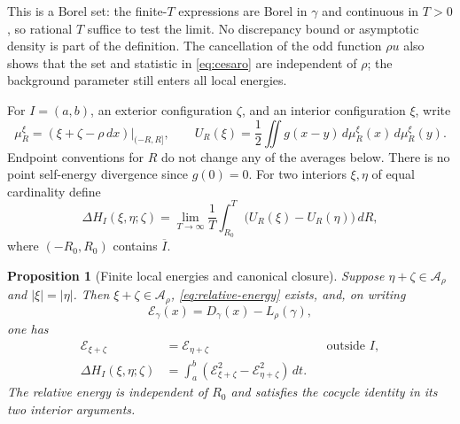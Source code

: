 \documentclass[11pt,reqno]{amsart}
\newtheorem{proposition}[theorem]{Proposition}
\theoremstyle{definition}
\theoremstyle{remark}
\newcommand{\1}{\mathbf 1}
\newcommand{\dd}{\,d}
\newcommand{\cA}{\mathcal A}
\numberwithin{equation}{section}
\begin{document}
This is a Borel set: the finite-$T$ expressions are Borel in $\gamma$
and continuous in $T>0$, so rational $T$ suffice to test the limit.
No discrepancy bound or asymptotic density is part of the definition.
The cancellation of the odd function $\rho u$ also shows that the
set and statistic in \eqref{eq:cesaro} are independent of $\rho$;
the background parameter still enters all local energies.

For $I=(a,b)$, an exterior configuration $\zeta$, and an interior
configuration $\xi$, write
\[
\mu_R^\xi=(\xi+\zeta-\rho\dd x)|_{(-R,R]},\qquad
U_R(\xi)=\frac12\iint g(x-y)\dd\mu_R^\xi(x)\dd\mu_R^\xi(y).
\]
Endpoint conventions for $R$ do not change any of the averages below.
There is no point self-energy divergence since $g(0)=0$.
For two interiors $\xi,\eta$ of equal cardinality define
\begin{equation}\label{eq:relative-energy}
\Delta H_I(\xi,\eta;\zeta)
=\lim_{T\to\infty}\frac1T\int_{R_0}^T
\bigl(U_R(\xi)-U_R(\eta)\bigr)\dd R,
\end{equation}
where $(-R_0,R_0)$ contains $\overline I$.

\begin{proposition}[Finite local energies and canonical closure]\label{prop:energy}
Suppose $\eta+\zeta\in\cA_\rho$ and $|\xi|=|\eta|$. Then
$\xi+\zeta\in\cA_\rho$, \eqref{eq:relative-energy} exists, and,
on writing
\begin{equation}\label{eq:normalized-field}
\mathcal E_\gamma(x)=D_\gamma(x)-L_\rho(\gamma),
\end{equation}
one has
\begin{align}
\mathcal E_{\xi+\zeta}&=\mathcal E_{\eta+\zeta}
&&\text{outside }I,\label{eq:retained-field}\\
\Delta H_I(\xi,\eta;\zeta)
&=\int_a^b\left(\mathcal E_{\xi+\zeta}^2
-\mathcal E_{\eta+\zeta}^2\right)\dd t.\label{eq:energy-field}
\end{align}
The relative energy is independent of $R_0$ and satisfies the cocycle
identity in its two interior arguments.
\end{proposition}
\end{document}

